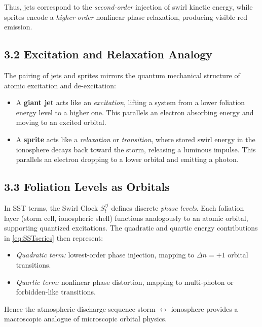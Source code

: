 \documentclass[11pt]{article}
\begin{document}
    Thus, jets correspond to the \emph{second-order} injection of swirl
    kinetic energy, while sprites encode a \emph{higher-order}
    nonlinear phase relaxation, producing visible red emission.

\subsection*{3.2 Excitation and Relaxation Analogy}

    The pairing of jets and sprites mirrors the quantum mechanical
    structure of atomic excitation and de-excitation:

    \begin{itemize}
    \item A \textbf{giant jet} acts like an \emph{excitation}, lifting a system
    from a lower foliation energy level to a higher one.
    This parallels an electron absorbing energy and moving to an
    excited orbital.

    \item A \textbf{sprite} acts like a \emph{relaxation} or \emph{transition},
    where stored swirl energy in the ionosphere decays back toward
    the storm, releasing a luminous impulse.
    This parallels an electron dropping to a lower orbital and
    emitting a photon.
    \end{itemize}

\subsection*{3.3 Foliation Levels as Orbitals}

    In SST terms, the Swirl Clock $S_t^{\boldsymbol{\circlearrowleft}}$
    defines discrete \emph{phase levels}.
    Each foliation layer (storm cell, ionospheric shell) functions
    analogously to an atomic orbital, supporting quantized excitations.
    The quadratic and quartic energy contributions in
    \eqref{eq:SSTseries} then represent:

    \begin{itemize}
    \item \emph{Quadratic term:} lowest-order phase injection,
    mapping to $\Delta n = +1$ orbital transitions.
    \item \emph{Quartic term:} nonlinear phase distortion,
    mapping to multi-photon or forbidden-like transitions.
    \end{itemize}

    Hence the atmospheric discharge sequence storm $\leftrightarrow$ ionosphere
    provides a macroscopic analogue of microscopic orbital physics.
\end{document}
